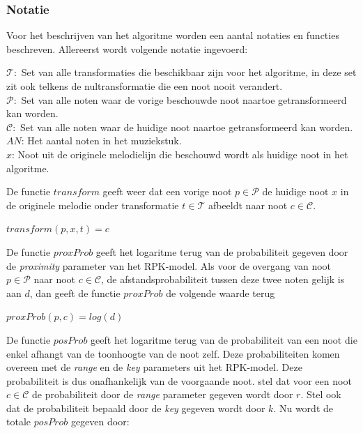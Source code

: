 \subsubsection{Notatie}
Voor het beschrijven van het algoritme worden een aantal notaties en functies beschreven. Allereerst wordt volgende notatie ingevoerd:

\begin{framed}
\noindent
$\mathcal{T}:$ Set van alle transformaties die beschikbaar zijn voor het algoritme, in deze set zit ook telkens de nultransformatie die een noot nooit verandert.\\
$\mathcal{P}:$ Set van alle noten waar de vorige beschouwde noot naartoe getransformeerd kan worden.\\
$\mathcal{C}:$ Set van alle noten waar de huidige noot naartoe getransformeerd kan worden.\\
$AN$: Het aantal noten in het muziekstuk.\\
$x$: Noot uit de originele melodielijn die beschouwd wordt als huidige noot in het algoritme.
\end{framed}

De functie $transform$ geeft weer dat een vorige noot $p\in \mathcal{P}$ de huidige noot $x$ in de originele melodie onder transformatie $t\in \mathcal{T}$ afbeeldt naar noot $c\in \mathcal{C}$.

\begin{framed}
\noindent
$transform(p,x,t)=c$
\end{framed}

De functie $proxProb$ geeft het logaritme terug van de probabiliteit gegeven door de \textit{proximity} parameter van het RPK-model. Als voor de overgang van noot $p\in \mathcal{P}$ naar noot $c\in \mathcal{C}$, de afstandsprobabiliteit tussen deze twee noten gelijk is aan $d$, dan geeft de functie $proxProb$ de volgende waarde terug

\begin{framed}
\noindent
$proxProb(p,c)=log(d)$
\end{framed}

De functie $posProb$ geeft het logaritme terug van de probabiliteit van een noot die enkel afhangt van de toonhoogte van de noot zelf. Deze probabiliteiten komen overeen met de \textit{range} en de \textit{key} parameters uit het RPK-model. Deze probabiliteit is dus onafhankelijk van de voorgaande noot. stel dat voor een noot $c\in \mathcal{C}$ de probabiliteit door de \textit{range} parameter gegeven wordt door $r$. Stel ook dat de probabiliteit bepaald door de \textit{key} gegeven wordt door $k$. Nu wordt de totale $posProb$ gegeven door:

